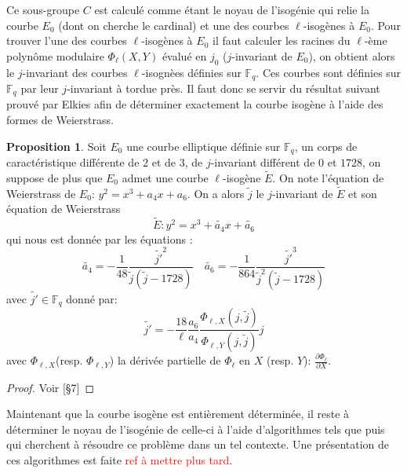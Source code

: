 \documentclass[10pt,a4paper]{book}
\theoremstyle{plain}
\theoremstyle{definition}
\theoremstyle{definition}
\theoremstyle{definition}
\newtheorem{prop}[thm]{Proposition}
\theoremstyle{definition}
\theoremstyle{remark}
\theoremstyle{remark}
\begin{document}
Ce sous-groupe $C$ est calculé comme étant le noyau de l'isogénie qui relie la courbe $E_0$ (dont on cherche le cardinal) et une des courbes $\ell$-isogènes à $E_0$. Pour trouver l'une des courbes $\ell$-isogènes à $E_0$ il faut calculer les racines du $\ell$-ème polynôme modulaire $\Phi_{\ell}(X,Y)$ évalué en $j_0$ ($j$-invariant de $E_0$), on obtient alors le $j$-invariant des courbes $\ell$-isognèes définies sur $\mathbb{F}_q$. Ces courbes sont définies sur $\mathbb{F}_q$ par leur $j$-invariant à tordue près. Il faut donc se servir du résultat suivant prouvé par Elkies afin de déterminer exactement la courbe isogène à l'aide des formes de Weierstrass.

\begin{prop}
\label{prop:elk:nor}
Soit $E_0$ une courbe elliptique définie sur $\mathbb{F}_q$, un corps de caractéristique différente de $2$ et de $3$, de $j$-invariant différent de $0$ et $1728$, on suppose de plus que $E_0$ admet une courbe $\ell$-isogène $\tilde{E}$. On note l'équation de Weierstrass de $E_0$: $y^2=x^3+a_4x+a_6$. On a alors $\tilde{j}$ le $j$-invariant de $\tilde{E}$ et son équation de Weierstrass
\begin{equation*}
\tilde{E}:y^2=x^3+\tilde{a_4}x+\tilde{a_6}
\end{equation*}
 qui nous est donnée par les équations : 
\begin{equation*}
\tilde{a_4}=-\frac{1}{48}\frac{\tilde{j'}^2}{\tilde{j}(\tilde{j}-1728)} \quad \tilde{a_6}=-\frac{1}{864}\frac{\tilde{j'}^3}{\tilde{j}^2(\tilde{j}-1728)}
\end{equation*}
avec $\tilde{j'} \in \mathbb{F}_q$ donné par:
\begin{equation*}
\tilde{j'}=-\frac{18}{\ell}\frac{a_6}{a_4}\frac{\Phi_{\ell,X}(j,\tilde{j})}{\Phi_{\ell,Y}(j,\tilde{j})}j
\end{equation*}
avec $\Phi_{\ell,X}$(resp. $\Phi_{\ell,Y}$) la dérivée partielle de $\Phi_{\ell}$ en $X$ (resp. $Y$): $\frac{\partial \Phi_{\ell}}{\partial X} $.
\end{prop} 

\begin{proof}
Voir \cite{Schoof95}[§7]
\end{proof}

Maintenant que la courbe isogène est entièrement déterminée, il reste à déterminer le noyau de l'isogénie de celle-ci à l'aide d'algorithmes tels que \cite{BMSS08}  puis \cite{Lercier-Sirvent2008} qui cherchent à résoudre ce problème dans un tel contexte. Une présentation de ces algorithmes est faite \textcolor{red}{ref à mettre plus tard}.
\end{document}
